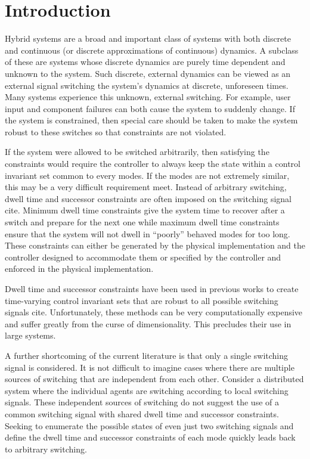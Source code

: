 \section{Introduction}
Hybrid systems are a broad and important class of systems with both discrete and continuous (or discrete approximations of continuous) dynamics. A subclass of these are systems whose discrete dynamics are purely time dependent and unknown to the system. Such discrete, external dynamics can be viewed as an external signal switching the system's dynamics at discrete, unforeseen times. Many systems experience this unknown, external switching. For example, user input and component failures can both cause the system to suddenly change. If the system is constrained, then special care should be taken to make the system robust to these switches so that constraints are not violated. 

If the system were allowed to be switched arbitrarily, then satisfying the constraints would require the controller to always keep the state within a control invariant set common to every modes. If the modes are not extremely similar, this may be a very difficult requirement meet. Instead of arbitrary switching, dwell time and successor constraints are often imposed on the switching signal \alert{cite}. Minimum dwell time constraints give the system time to recover after a switch and prepare for the next one while maximum dwell time constraints ensure that the system will not dwell in ``poorly'' behaved modes for too long. These constraints can either be generated by the physical implementation and the controller designed to accommodate them or specified by the controller and enforced in the physical implementation.

Dwell time and successor constraints have been used in previous works to create time-varying control invariant sets that are robust to all possible switching signals \alert{cite}. Unfortunately, these methods can be very computationally expensive and suffer greatly from the curse of dimensionality. This precludes their use in large systems. 

A further shortcoming of the current literature is that only a single switching signal is considered. It is not difficult to imagine cases where there are multiple sources of switching that are independent from each other. Consider a distributed system where the individual agents are switching according to local switching signals. These independent sources of switching do not suggest the use of a common switching signal with shared dwell time and successor constraints. Seeking to enumerate the possible states of even just two switching signals and define the dwell time and successor constraints of each mode quickly leads back to arbitrary switching.

